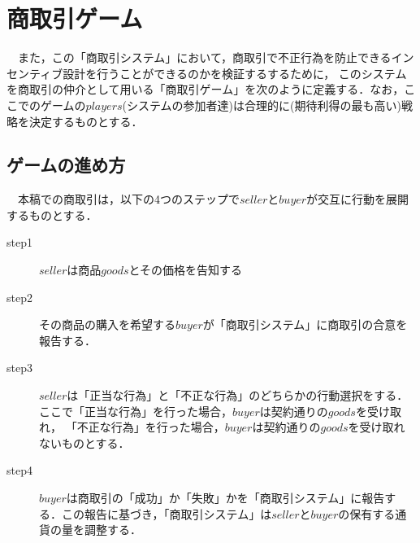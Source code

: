 \section{商取引ゲーム}
　また，この「商取引システム」において，商取引で不正行為を防止できるインセンティブ設計を行うことができるのかを検証するするために，
  このシステムを商取引の仲介として用いる「商取引ゲーム」を次のように定義する．なお，ここでのゲームの$players$(システムの参加者達)は合理的に(期待利得の最も高い)戦略を決定するものとする．
  
  \subsection{ゲームの進め方}
  　本稿での商取引は，以下の4つのステップで$seller$と$buyer$が交互に行動を展開するものとする．
  
    \begin{description}
      \item[step1] $seller$は商品$goods$とその価格を告知する
      \item[step2]  その商品の購入を希望する$buyer$が「商取引システム」に商取引の合意を報告する．
      \item[step3]  $seller$は「正当な行為」と「不正な行為」のどちらかの行動選択をする．ここで「正当な行為」を行った場合，$buyer$は契約通りの$goods$を受け取れ， 「不正な行為」を行った場合，$buyer$は契約通りの$goods$を受け取れないものとする．
      \item[step4]  $buyer$は商取引の「成功」か「失敗」かを「商取引システム」に報告する．この報告に基づき，「商取引システム」は$ seller$と$ buyer$の保有する通貨の量を調整する．
    \end{description}

